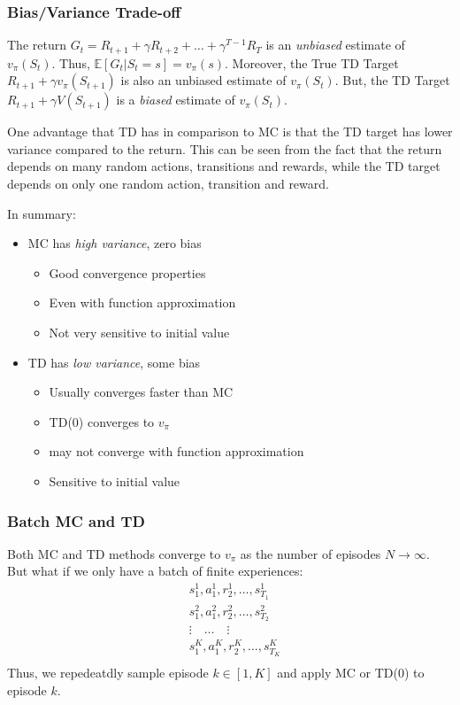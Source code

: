 \subsubsection*{Bias/Variance Trade-off}
The return \(G_t = R_{t+1} + \gamma R_{t+2} + \dots + \gamma^{T-1}R_T\) is an \emph{unbiased}
estimate of \(v_{\pi}(S_t)\). Thus, \(\mathbb{E}[G_t | S_t = s] = v_{\pi}(s)\). Moreover,
the True TD Target \(R_{t+1} + \gamma v_\pi (S_{t+1})\) is also an unbiased estimate of
\(v_{\pi}(S_t)\). 
But, the TD Target \(R_{t+1} + \gamma V(S_{t+1})\) is a \emph{biased} estimate of \(v_{\pi}(S_t)\).

One advantage that TD has in comparison to MC is that the TD target has lower variance
compared to the return. This can be seen from the fact that the return depends 
on many random actions, transitions and rewards, while the TD target depends on only one
random action, transition and reward.

In summary:
\begin{itemize}
    \item MC has \emph{high variance}, zero bias
    \begin{itemize}
        \item Good convergence properties
        \item Even with function approximation
        \item Not very sensitive to initial value
    \end{itemize}
    \item TD has \emph{low variance}, some bias
    \begin{itemize}
        \item Usually converges faster than MC
        \item TD(0) converges to \(v_{\pi}\)
        \item may not converge with function approximation
        \item Sensitive to initial value
    \end{itemize}
\end{itemize}

\subsubsection{Batch MC and TD}
Both MC and TD methods converge to \(v_{\pi}\) as the number of episodes \(N \to \infty\). 
But what if we only have a batch of finite experiences:
\[
    \begin{aligned}
        & s^1_1, a^1_1, r^1_2, \dots, s^1_{T_1} \\
        & s^2_1, a^2_1, r^2_2, \dots, s^2_{T_2} \\
        &\vdots \quad \dots  \quad \vdots \\
        & s^K_1, a^K_1, r^K_2, \dots, s^K_{T_K} \\
    \end{aligned}
\]
Thus, we repedeatdly sample episode \(k \in [1,K]\) and apply MC or TD(0) to
episode \(k\).

